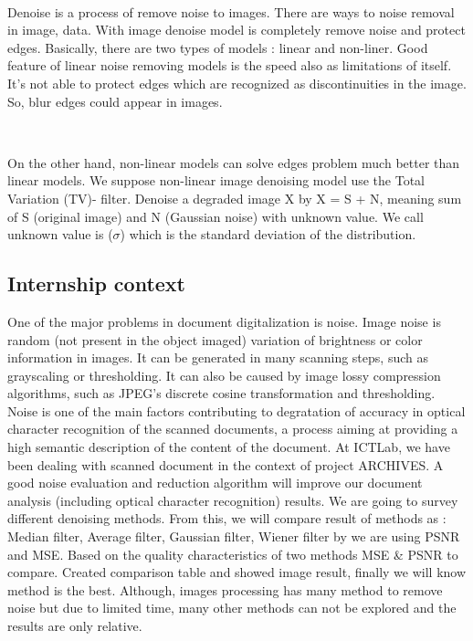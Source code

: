\

Denoise is a process of remove noise to images. There are ways to noise removal in image, data. With image denoise model is completely remove noise and protect edges. Basically, there are two types of models : linear and non-liner. Good feature of linear noise removing models is the speed also as limitations of itself. It's not able to protect edges which are recognized as discontinuities in the image. So, blur edges could appear in images.

\

On the other hand, non-linear models can solve edges problem much better than linear models. We suppose non-linear image denoising model use the Total Variation (TV)- filter. Denoise a degraded image X by X = S + N, meaning sum of S (original image) and N (Gaussian noise) with unknown value. We call unknown value is ($\sigma$) which is the standard deviation of the distribution.





\vspace*{1cm}




\subsection{Internship context}
One of the major problems in document digitalization is noise. Image noise is random (not present in the object imaged) variation of brightness or color information in images. It can be generated in many scanning steps, such as grayscaling or thresholding. It can also be caused by image lossy compression algorithms, such as JPEG’s discrete cosine transformation and thresholding. Noise is one of the main factors contributing to degratation of accuracy in optical character recognition of the scanned documents, a process aiming at providing a high semantic description of the content of the document. At ICTLab, we have been dealing with scanned document in the context of project ARCHIVES. A good noise evaluation and reduction algorithm will improve our document analysis (including optical character recognition) results. We are going to survey different denoising methods. From this, we will compare result of methods as : Median filter, Average filter, Gaussian filter, Wiener filter by we are using PSNR and MSE. Based on the quality characteristics of two methods MSE \& PSNR to compare. Created comparison table and showed image result, finally we will know method is the best. Although, images processing has many method to remove noise but due to limited time, many other methods can not be explored and the results are only relative.


